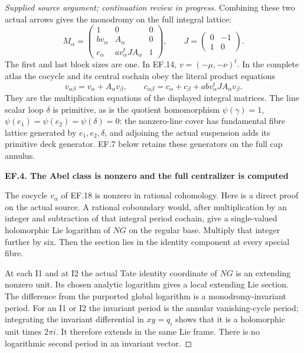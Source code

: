 \begin{proof}[Supplied source argument; continuation review in progress]
Combining these two actual arrows gives the monodromy on the full
integral lattice:
\[
 M_\alpha=
 \begin{pmatrix}
 1&0&0\\
 b v_\alpha&A_\alpha&0\\
 c_\alpha&a v_\alpha^t J A_\alpha&1
 \end{pmatrix},\qquad
 J=\begin{pmatrix}0&-1\\1&0\end{pmatrix}.
 \tag{EF.18}
\]
The first and last block sizes are one. In EF.14,
\(v=(-\mu,-\nu)^t\). In the complete atlas the cocycle and its
central cochain obey the literal product equations
\[
 v_{\alpha\beta}=v_\alpha+A_\alpha v_\beta,\qquad
 c_{\alpha\beta}=c_\alpha+c_\beta+
             ab v_\alpha^t J A_\alpha v_\beta.
 \tag{EF.19}
\]
They are the multiplication equations of the displayed integral
matrices. The line scalar loop \(\delta\) is primitive, as is the
quotient homomorphism \(\psi(\gamma)=1\),
\(\psi(e_1)=\psi(e_2)=\psi(\delta)=0\): the nonzero-line cover
has fundamental fibre lattice generated by \(e_1,e_2,\delta\),
and adjoining the actual suspension adds its primitive deck generator.
EF.7 below retains these generators on the full cap annulus.

\par

\medskip\noindent\textbf{EF.4. The Abel class is nonzero and the full centralizer is computed}

\par\nobreak

The cocycle \(v_\alpha\) of EF.18 is nonzero in rational cohomology.
Here is a direct proof on the actual source. A rational coboundary would,
after multiplication by an integer and subtraction of that integral
period cochain, give a single-valued holomorphic Lie logarithm of
\(NG\) on the regular base. Multiply that integer further by six.
Then the section lies in the identity component at every special fibre.

At each I1 and at I2 the actual Tate identity coordinate of \(NG\)
is an extending nonzero unit. Its chosen analytic logarithm gives a
local extending Lie section. The difference from the purported global
logarithm is a monodromy-invariant period. For an I1 or I2 the invariant
period is the annular vanishing-cycle period; integrating the invariant
differential in \(xy=q_i\) shows that it is a holomorphic unit times
\(2\pi i\). It therefore extends in the same Lie frame. There is
no logarithmic second period in an invariant vector.


\end{proof}
